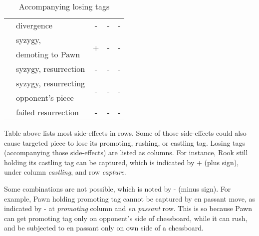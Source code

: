 \begin{table}[!h]
\begin{tabular}{ rlccc }
\alg{/}                     & divergence            & -                    & -                     & -                     \\
\cmidrule{1-5} %
\multirow{2}{*}{\alg{>}}    & syzygy,               & \multirow{2}{*}{+}   & \multirow{2}{*}{-}    & \multirow{2}{*}{-}    \\
                            & demoting to Pawn      &                      &                       &                       \\
\cmidrule{1-5} %
\alg{\$}                    & syzygy, resurrection  & -                    & -                     & -                     \\
\cmidrule{1-5} %
\multirow{2}{*}{\alg{\$\$}} & syzygy, resurrecting  & \multirow{2}{*}{-}   & \multirow{2}{*}{-}    & \multirow{2}{*}{-}    \\
                            & opponent's piece      &                      &                       &                       \\
\cmidrule{1-5} %
\alg{\$\$\$}                & failed resurrection   & -                    & -                     & -                     \\
\bottomrule %
\end{tabular}
\caption{Accompanying losing tags}
\label{tbl:Appendix/Summary/Accompanying-losing-tags}
\end{table}

Table above lists most side-effects in rows. Some of those side-effects could also cause
targeted piece to lose its promoting, rushing, or castling tag. Losing tags (accompanying
those side-effects) are listed as columns. For instance, Rook still holding its castling
tag can be captured, which is indicated by + (plus sign), under column \emph{castling},
and row \emph{capture}.

Some combinations are not possible, which is noted by - (minus sign). For example, Pawn
holding promoting tag cannot be captured by en passant move, as indicated by - at
\emph{promoting} column and \emph{en passant} row. This is so because Pawn can get
promoting tag only on opponent's side of chessboard, while it can rush, and be subjected
to en passant only on own side of a chessboard.

